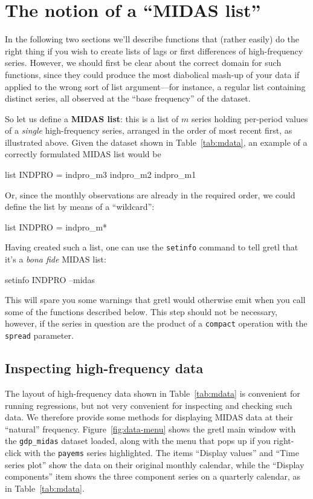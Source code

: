 \documentclass{article}
\begin{document}
\section{The notion of a ``MIDAS list''}
\label{sec:midas-list}

In the following two sections we'll describe functions that (rather
easily) do the right thing if you wish to create lists of lags or
first differences of high-frequency series. However, we should first
be clear about the correct domain for such functions, since they could
produce the most diabolical mash-up of your data if applied to the
wrong sort of list argument---for instance, a regular list containing
distinct series, all observed at the ``base frequency'' of the
dataset.

So let us define a \textbf{MIDAS list}: this is a list of $m$ series
holding per-period values of a \textit{single} high-frequency series,
arranged in the order of most recent first, as illustrated
above. Given the dataset shown in Table~\ref{tab:mdata}, an example
of a correctly formulated MIDAS list would be
%
\begin{code}
list INDPRO = indpro_m3 indpro_m2 indpro_m1
\end{code}
%
Or, since the monthly observations are already in the required order,
we could define the list by means of a ``wildcard'':
%
\begin{code}
list INDPRO = indpro_m*
\end{code}

Having created such a list, one can use the \texttt{setinfo} command
to tell gretl that it's a \textit{bona fide} MIDAS list:
%
\begin{code}
setinfo INDPRO --midas
\end{code}
%
This will spare you some warnings that gretl would otherwise emit when
you call some of the functions described below. This step should not
be necessary, however, if the series in question are the product of a
\texttt{compact} operation with the \texttt{spread} parameter.

\subsection{Inspecting high-frequency data}

The layout of high-frequency data shown in Table~\ref{tab:mdata} is
convenient for running regressions, but not very convenient for
inspecting and checking such data. We therefore provide some methods
for displaying MIDAS data at their ``natural''
frequency. Figure~\ref{fig:data-menu} shows the gretl main window with
the \texttt{gdp\_midas} dataset loaded, along with the menu that pops
up if you right-click with the \texttt{payems} series highlighted.
The items ``Display values'' and ``Time series plot'' show the data
on their original monthly calendar, while the ``Display components''
item shows the three component series on a quarterly calendar, as
in Table~\ref{tab:mdata}.
\end{document}
